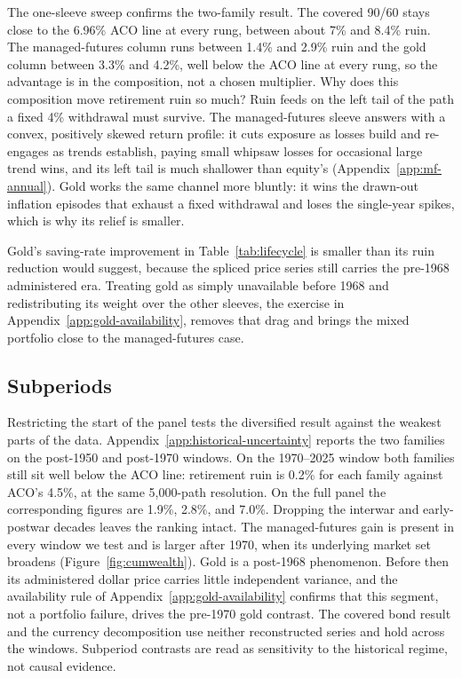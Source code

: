 \documentclass[11pt]{article}
\begin{document}
The one-sleeve sweep confirms the two-family result. The covered 90/60 stays
close to the 6.96\% ACO line at every rung, between about 7\% and 8.4\%
ruin. The managed-futures column runs between 1.4\% and 2.9\% ruin and the
gold column between 3.3\% and 4.2\%, well below the ACO line at every rung,
so the advantage is in the composition, not a chosen multiplier.
Why does this composition move retirement ruin so much? Ruin feeds on the
left tail of the path a fixed 4\% withdrawal must survive. The managed-futures
sleeve answers with a convex, positively skewed return profile: it cuts
exposure as losses build and re-engages as trends establish, paying small
whipsaw losses for occasional large trend wins, and its left tail is much
shallower than equity's (Appendix~\ref{app:mf-annual}). Gold works the same
channel more bluntly: it wins the drawn-out inflation episodes that exhaust a
fixed withdrawal and loses the single-year spikes, which is why its relief is
smaller.

Gold's saving-rate improvement in Table~\ref{tab:lifecycle} is smaller than its
ruin reduction would suggest, because the spliced price series still carries the
pre-1968 administered era. Treating gold as simply unavailable before 1968 and
redistributing its weight over the other sleeves, the exercise in
Appendix~\ref{app:gold-availability}, removes that drag and brings the mixed
portfolio close to the managed-futures case.

\subsection{Subperiods}
\label{sec:subperiods}

Restricting the start of the panel tests the diversified result against the
weakest parts of the data. Appendix~\ref{app:historical-uncertainty} reports
the two families on the post-1950 and post-1970 windows. On the 1970--2025
window both families still sit well below the ACO line: retirement ruin is
0.2\% for each family against ACO's 4.5\%, at the same 5,000-path
resolution. On the full panel the corresponding figures are 1.9\%, 2.8\%,
and 7.0\%. Dropping the interwar and early-postwar decades leaves the ranking intact. The managed-futures gain is present in
every window we test and is larger after 1970, when its underlying market set broadens
(Figure~\ref{fig:cumwealth}).
Gold is a post-1968 phenomenon. Before then its administered dollar price
carries little independent variance, and the availability rule of
Appendix~\ref{app:gold-availability} confirms that this segment, not a
portfolio failure, drives the pre-1970 gold contrast. The covered bond result
and the currency decomposition use neither reconstructed series and hold across
the windows. Subperiod contrasts are read as sensitivity to the historical
regime, not causal evidence.
\end{document}
